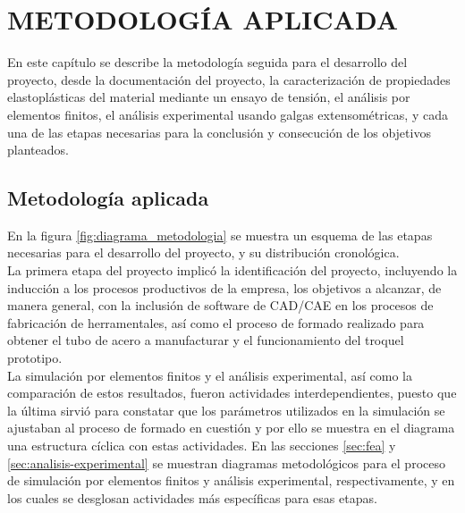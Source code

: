 \chapter{METODOLOGÍA APLICADA}

En este capítulo se describe la metodología seguida para el desarrollo del proyecto, 
desde la documentación del proyecto, la caracterización de propiedades elastoplásticas 
del material mediante un ensayo de tensión, el análisis por elementos finitos, 
el análisis experimental usando galgas extensométricas, y cada una de las etapas 
necesarias para la conclusión y consecución de los objetivos planteados. 

\section{Metodología aplicada}

En la figura \ref{fig:diagrama_metodologia} se muestra un esquema de las etapas necesarias 
para el desarrollo del proyecto, y su distribución cronológica.\\

La primera etapa del proyecto implicó la identificación del proyecto, incluyendo la 
inducción a los procesos productivos de la empresa, los objetivos a alcanzar, de manera general, 
con la inclusión de software de CAD/CAE en los procesos de fabricación de herramentales, 
así como el proceso de formado realizado para obtener el tubo de acero a manufacturar 
y el funcionamiento del troquel prototipo.\\

La simulación por elementos finitos y el análisis experimental, así como la 
comparación de estos resultados, fueron actividades interdependientes, puesto que la 
última sirvió para constatar que los parámetros utilizados en la simulación se 
ajustaban al proceso de formado en cuestión y por ello se muestra en el diagrama 
una estructura cíclica con estas actividades. En las secciones \ref{sec:fea} y \ref{sec:analisis-experimental} 
se muestran diagramas metodológicos para el proceso de simulación por elementos finitos y análisis experimental, 
respectivamente, y en los cuales se desglosan actividades más específicas para esas etapas.

